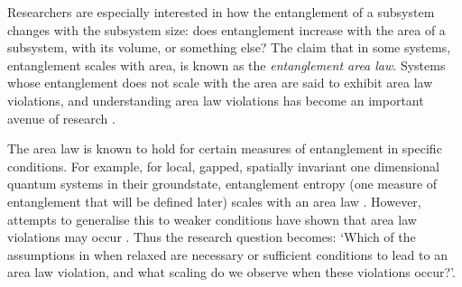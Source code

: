 


Researchers are especially interested in how the entanglement of a subsystem changes with the subsystem size: does entanglement increase with the area of a subsystem, with its volume, or something else? The claim that in some systems, entanglement scales with area, is known as the \textit{entanglement area law}. Systems whose entanglement does not scale with the area are said to exhibit area law violations, and understanding area law violations has become an important avenue of research \cite{eisert_review}.

The area law is known to hold for certain measures of entanglement in specific conditions. For example, for local, gapped, spatially invariant one dimensional quantum systems in their groundstate, entanglement entropy (one measure of entanglement that will be defined later)  scales with an area law \cite{hastings_area_law}. However, attempts to generalise this to weaker conditions have shown that area law violations may occur \cite{refael2004}. Thus the research question becomes: `Which of the assumptions in \cite{hastings_area_law} when relaxed are necessary or sufficient conditions to lead to an area law violation, and what scaling do we observe when these violations occur?'. 

